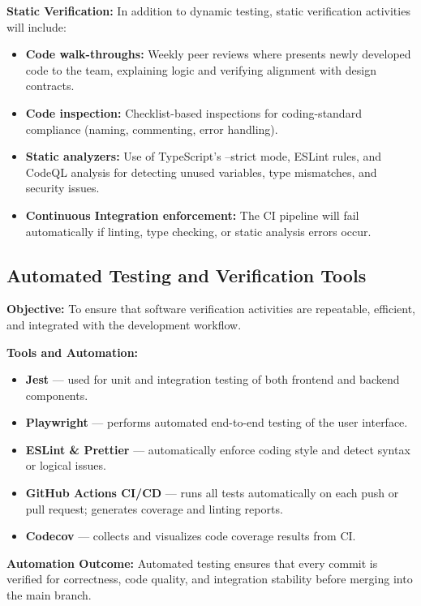 \documentclass[12pt, titlepage]{article}
\begin{document}
\noindent \textbf{Static Verification:}  
    In addition to dynamic testing, static verification activities will include:
    \begin{itemize}
        \item \textbf{Code walk-throughs:} Weekly peer reviews where presents newly developed code to the team, explaining logic and verifying alignment with design contracts.  
        \item \textbf{Code inspection:} Checklist-based inspections for coding-standard compliance (naming, commenting, error handling).  
        \item \textbf{Static analyzers:}  
        Use of TypeScript’s --strict mode, ESLint rules, and CodeQL analysis for detecting unused variables, type mismatches, and security issues.  
        \item \textbf{Continuous Integration enforcement:}  
        The CI pipeline will fail automatically if linting, type checking, or static analysis errors occur.
    \end{itemize}


\subsection{Automated Testing and Verification Tools}

\noindent\textbf{Objective:}  
To ensure that software verification activities are repeatable, efficient, and integrated with the development workflow.

\noindent\textbf{Tools and Automation:}
\begin{itemize}
    \item \textbf{Jest} --- used for unit and integration testing of both frontend and backend components.
    \item \textbf{Playwright} --- performs automated end-to-end testing of the user interface.
    \item \textbf{ESLint \& Prettier} --- automatically enforce coding style and detect syntax or logical issues.
    \item \textbf{GitHub Actions CI/CD} --- runs all tests automatically on each push or pull request; generates coverage and linting reports.
    \item \textbf{Codecov} --- collects and visualizes code coverage results from CI.
\end{itemize}

\noindent\textbf{Automation Outcome:}  
Automated testing ensures that every commit is verified for correctness, code quality, and integration stability before merging into the main branch.
\end{document}
